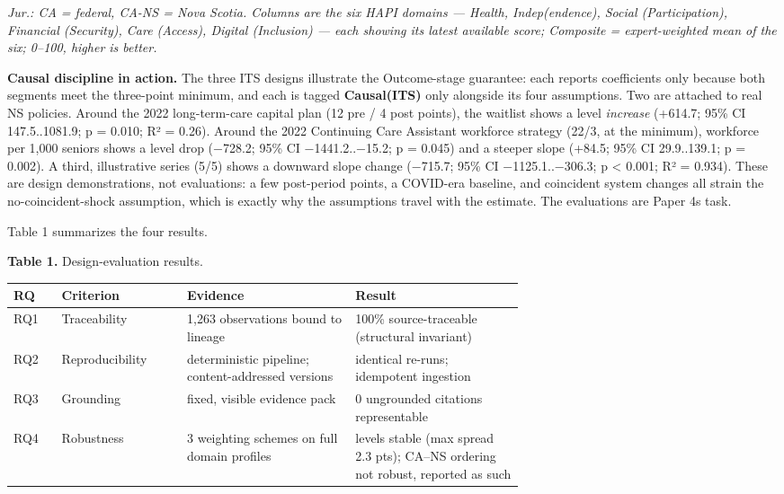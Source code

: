 \documentclass[
  11pt,
]{article}
\begin{document}
\emph{Jur.: CA = federal, CA-NS = Nova Scotia. Columns are the six HAPI
domains --- Health, Indep(endence), Social (Participation), Financial
(Security), Care (Access), Digital (Inclusion) --- each showing its
latest available score; Composite = expert-weighted mean of the six;
0--100, higher is better.}

\textbf{Causal discipline in action.} The three ITS designs illustrate
the Outcome-stage guarantee: each reports coefficients only because both
segments meet the three-point minimum, and each is tagged
\textbf{Causal(ITS)} only alongside its four assumptions. Two are
attached to real NS policies. Around the 2022 long-term-care capital
plan (12 pre / 4 post points), the waitlist shows a level
\emph{increase} (+614.7; 95\% CI 147.5..1081.9; p = 0.010; R² = 0.26).
Around the 2022 Continuing Care Assistant workforce strategy (22/3, at
the minimum), workforce per 1,000 seniors shows a level drop (−728.2;
95\% CI −1441.2..−15.2; p = 0.045) and a steeper slope (+84.5; 95\% CI
29.9..139.1; p = 0.002). A third, illustrative series (5/5) shows a
downward slope change (−715.7; 95\% CI −1125.1..−306.3; p \textless{}
0.001; R² = 0.934). These are design demonstrations, not evaluations: a
few post-period points, a COVID-era baseline, and coincident system
changes all strain the no-coincident-shock assumption, which is exactly
why the assumptions travel with the estimate. The evaluations are Paper
4\textquotesingle s task.

Table 1 summarizes the four results.

\textbf{Table 1.} Design-evaluation results.

\begin{longtable}[]{@{}llp{0.33\linewidth}p{0.33\linewidth}@{}}
\toprule\noalign{}
RQ & Criterion & Evidence & Result \\
\midrule\noalign{}
\endhead
\bottomrule\noalign{}
\endlastfoot
RQ1 & Traceability & 1,263 observations bound to lineage & 100\%
source-traceable (structural invariant) \\
RQ2 & Reproducibility & deterministic pipeline; content-addressed
versions & identical re-runs; idempotent ingestion \\
RQ3 & Grounding & fixed, visible evidence pack & 0 ungrounded citations
representable \\
RQ4 & Robustness & 3 weighting schemes on full domain profiles & levels
stable (max spread 2.3 pts); CA--NS ordering not robust, reported as
such \\
\end{longtable}
\end{document}
